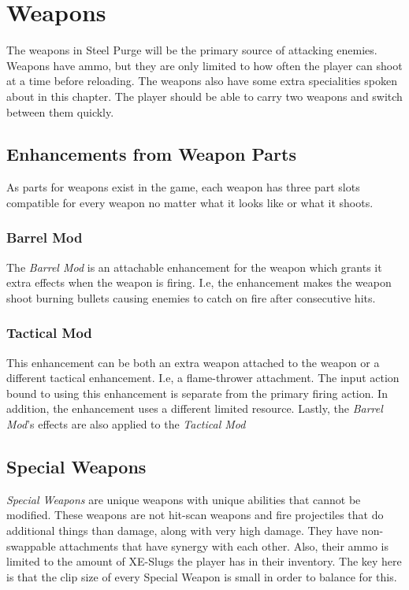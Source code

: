 \documentclass[../Main.tex]{subfiles}
\begin{document}
\section{Weapons}

The weapons in Steel Purge will be the primary source of attacking enemies. Weapons have ammo, but they are only limited to how often the player can shoot at a time before reloading. The weapons also have some extra specialities spoken about in this chapter. The player should be able to carry two weapons and switch between them quickly.

\subsection{Enhancements from Weapon Parts}

As parts for weapons exist in the game, each weapon has three part slots compatible for every weapon no matter what it looks like or what it shoots.

\subsubsection{Barrel Mod}

The \emph{Barrel Mod} is an attachable enhancement for the weapon which grants it extra effects when the weapon is firing. I.e, the enhancement makes the weapon shoot burning bullets causing enemies to catch on fire after consecutive hits. 

\subsubsection{Tactical Mod}

This enhancement can be both an extra weapon attached to the weapon or a different tactical enhancement. I.e, a flame-thrower attachment. The input action bound to using this enhancement is separate from the primary firing action. In addition, the enhancement uses a different limited resource. Lastly, the \emph{Barrel Mod}'s effects are also applied to the \emph{Tactical Mod} 

\subsection{Special Weapons}

\emph{Special Weapons} are unique weapons with unique abilities that cannot be modified. These weapons are not hit-scan weapons and fire projectiles that do additional things than damage, along with very high damage. They have non-swappable attachments that have synergy with each other. Also, their ammo is limited to the amount of XE-Slugs the player has in their inventory. The key here is that the clip size of every Special Weapon is small in order to balance for this. 
\end{document}
